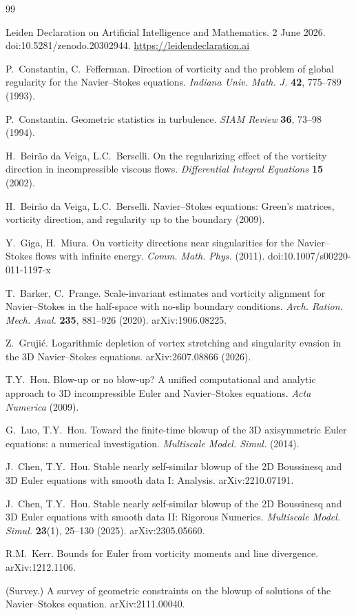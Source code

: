 \documentclass[11pt]{article}
\begin{document}
\begin{thebibliography}{99}

 Leiden Declaration on Artificial Intelligence
and Mathematics. 2 June 2026. doi:10.5281/zenodo.20302944.
\url{https://leidendeclaration.ai}


 P.~Constantin, C.~Fefferman.
Direction of vorticity and the problem of global regularity for the
Navier--Stokes equations.
\emph{Indiana Univ. Math. J.} \textbf{42}, 775--789 (1993).

 P.~Constantin.
Geometric statistics in turbulence.
\emph{SIAM Review} \textbf{36}, 73--98 (1994).

 H.~Beir\~ao da Veiga, L.C.~Berselli.
On the regularizing effect of the vorticity direction in incompressible
viscous flows.
\emph{Differential Integral Equations} \textbf{15} (2002).

 H.~Beir\~ao da Veiga, L.C.~Berselli.
Navier--Stokes equations: Green's matrices, vorticity direction, and
regularity up to the boundary (2009).

 Y.~Giga, H.~Miura.
On vorticity directions near singularities for the Navier--Stokes flows
with infinite energy.
\emph{Comm. Math. Phys.} (2011). doi:10.1007/s00220-011-1197-x

 T.~Barker, C.~Prange.
Scale-invariant estimates and vorticity alignment for Navier--Stokes in
the half-space with no-slip boundary conditions.
\emph{Arch. Ration. Mech. Anal.} \textbf{235}, 881--926 (2020).
arXiv:1906.08225.

 Z.~Gruji\'c.
Logarithmic depletion of vortex stretching and singularity evasion in the
3D Navier--Stokes equations.
arXiv:2607.08866 (2026).

 T.Y.~Hou.
Blow-up or no blow-up? A unified computational and analytic approach to 3D
incompressible Euler and Navier--Stokes equations.
\emph{Acta Numerica} (2009).

 G.~Luo, T.Y.~Hou.
Toward the finite-time blowup of the 3D axisymmetric Euler equations: a
numerical investigation.
\emph{Multiscale Model. Simul.} (2014).

 J.~Chen, T.Y.~Hou.
Stable nearly self-similar blowup of the 2D Boussinesq and 3D Euler
equations with smooth data I: Analysis.
arXiv:2210.07191.

 J.~Chen, T.Y.~Hou.
Stable nearly self-similar blowup of the 2D Boussinesq and 3D Euler
equations with smooth data II: Rigorous Numerics.
\emph{Multiscale Model. Simul.} \textbf{23}(1), 25--130 (2025).
arXiv:2305.05660.

 R.M.~Kerr.
Bounds for Euler from vorticity moments and line divergence.
arXiv:1212.1106.

 (Survey.)
A survey of geometric constraints on the blowup of solutions of the
Navier--Stokes equation.
arXiv:2111.00040.

\end{thebibliography}
\end{document}
